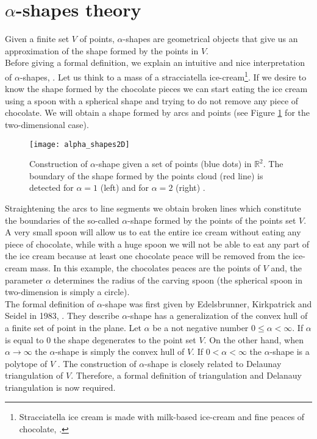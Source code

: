 \section{$\alpha$-shapes theory}\label{sec:alpha-shapes}
Given a finite set $V$ of points, $\alpha$-shapes are geometrical objects that give us an approximation of the shape formed by the points in $V$.\\ \indent
Before giving a formal definition, we explain an intuitive and nice interpretation of $\alpha$-shapes, \cite{lucieer2004alpha}. 
Let us think to a mass of a stracciatella ice-cream\footnote{Stracciatella ice cream is made with milk-based ice-cream and fine peaces of chocolate, \cite{Wiki3}.}. If we desire to know the shape formed by the chocolate pieces we can start eating the ice cream using a spoon with a spherical shape and trying to do not remove any piece of chocolate. 
We will obtain a shape formed by arcs and points (see Figure \ref{fig:shape2d} for the two-dimensional case).
\begin{figure}[t]\label{fig:shape2d}
\begin{center}
\texttt{[image: alpha\_shapes2D]}
\label{fig:shape}
\caption{Construction of $\alpha$-shape given a set of points (blue dots) in $\mathbb{R}^2$. The boundary of the shape formed by the points cloud (red line) is detected for $\alpha = 1$ (left) and for $\alpha=2$ (right) \cite{sabel2017application}.}
\label{fig:shape2d}
\end{center}
\end{figure}
Straightening the arcs to line segments we obtain broken lines which constitute the boundaries of the so-called $\alpha$-shape formed by the points of the points set $V$. 
A very small spoon will allow us to eat the entire ice cream without eating any piece of chocolate, while with a huge spoon we will not be able to eat any part of the ice cream because at least one chocolate peace will be removed from the ice-cream mass. In this example, the chocolates peaces are the points of $V$ and, the parameter $\alpha$ determines the radius of the carving spoon (the spherical spoon in two-dimension is simply a circle).\\ \indent 
The formal definition of $\alpha$-shape was first given by Edelsbrunner, Kirkpatrick and Seidel in 1983, \cite{edelsbrunner1983shape}. They describe $\alpha$-shape has a generalization of the convex hull of a finite set of point in the plane. Let $\alpha$ be a not negative number $0\leq\alpha<\infty$. 
If $\alpha$ is equal to $0$ the shape degenerates to the point set $V$. On the other hand, when $\alpha\rightarrow\infty$ the $\alpha$-shape is simply the convex hull of $V$. If $0<\alpha<\infty$ the $\alpha$-shape is a polytope of $V$ \cite{edelsbrunner1994three}. The construction of $\alpha$-shape is closely related to Delaunay triangulation of $V$\cite{mucke1993shapes}. Therefore, a formal definition of triangulation and Delanauy triangulation is now required. \\ \indent
